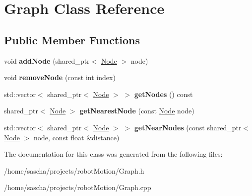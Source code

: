 \hypertarget{class_graph}{\section{Graph Class Reference}
\label{class_graph}
}
\subsection*{Public Member Functions}
\begin{DoxyCompactItemize}
\item 
\hypertarget{class_graph_ac4736c6d4b946ab7249bf8e4a84df2d4}{void {\bfseries add\-Node} (shared\-\_\-ptr$<$ \hyperlink{class_node}{Node} $>$ node)}\label{class_graph_ac4736c6d4b946ab7249bf8e4a84df2d4}

\item 
\hypertarget{class_graph_a183c86d4f21573c2a67204583e9108d9}{void {\bfseries remove\-Node} (const int index)}\label{class_graph_a183c86d4f21573c2a67204583e9108d9}

\item 
\hypertarget{class_graph_a13c3317fdecc13e9a900a6ef69c9387e}{std\-::vector$<$ shared\-\_\-ptr$<$ \hyperlink{class_node}{Node} $>$ $>$ {\bfseries get\-Nodes} () const }\label{class_graph_a13c3317fdecc13e9a900a6ef69c9387e}

\item 
\hypertarget{class_graph_a083a9aa551b6c79618be08a520a520f5}{shared\-\_\-ptr$<$ \hyperlink{class_node}{Node} $>$ {\bfseries get\-Nearest\-Node} (const \hyperlink{class_node}{Node} node)}\label{class_graph_a083a9aa551b6c79618be08a520a520f5}

\item 
\hypertarget{class_graph_a7d11365c5e0730d1211e27e8f51810b0}{std\-::vector$<$ shared\-\_\-ptr$<$ \hyperlink{class_node}{Node} $>$ $>$ {\bfseries get\-Near\-Nodes} (const shared\-\_\-ptr$<$ \hyperlink{class_node}{Node} $>$ node, const float \&distance)}\label{class_graph_a7d11365c5e0730d1211e27e8f51810b0}

\end{DoxyCompactItemize}


The documentation for this class was generated from the following files\-:\begin{DoxyCompactItemize}
\item 
/home/sascha/projects/robot\-Motion/Graph.\-h\item 
/home/sascha/projects/robot\-Motion/Graph.\-cpp\end{DoxyCompactItemize}
